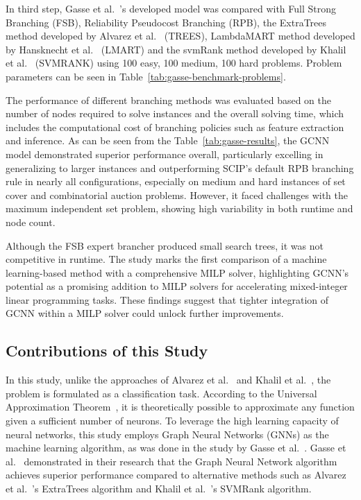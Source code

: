 In third step, Gasse et al.~\cite{gasseExactCombinatorialOptimization2019}'s developed model was compared with Full Strong Branching (FSB), Reliability Pseudocost Branching (RPB), the ExtraTrees method developed by Alvarez et al.~\cite{alvarezMachineLearningBasedApproximation2017} (TREES), LambdaMART method developed by Hansknecht et al.~\cite{hansknechtCutsPrimalHeuristics2018a} (LMART) and the svmRank method developed by Khalil et al.~\cite{khalilLearningBranchMixed2016} (SVMRANK) using 100 easy, 100 medium, 100 hard problems.
Problem parameters can be seen in Table~\ref{tab:gasse-benchmark-problems}.



The performance of different branching methods was evaluated based on the number of nodes required to solve instances and the overall solving time, which includes the computational cost of branching policies such as feature extraction and inference.
As can be seen from the Table~\ref{tab:gasse-results}, the GCNN model demonstrated superior performance overall, particularly excelling in generalizing to larger instances and outperforming SCIP's default RPB branching rule in nearly all configurations, especially on medium and hard instances of set cover and combinatorial auction problems.
However, it faced challenges with the maximum independent set problem, showing high variability in both runtime and node count.


Although the FSB expert brancher produced small search trees, it was not competitive in runtime.
The study marks the first comparison of a machine learning-based method with a comprehensive MILP solver, highlighting GCNN's potential as a promising addition to MILP solvers for accelerating mixed-integer linear programming tasks.
These findings suggest that tighter integration of GCNN within a MILP solver could unlock further improvements.



\subsection{Contributions of this Study}
In this study, unlike the approaches of Alvarez et al.~\cite{alvarezMachineLearningBasedApproximation2017} and Khalil et al.~\cite{khalilLearningBranchMixed2016}, the problem is formulated as a classification task.
According to the Universal Approximation Theorem~\cite{luUniversalApproximationTheorem2020}, it is theoretically possible to approximate any function given a sufficient number of neurons.
To leverage the high learning capacity of neural networks, this study employs Graph Neural Networks (GNNs) as the machine learning algorithm, as was done in the study by Gasse et al.~\cite{gasseExactCombinatorialOptimization2019}.
Gasse et al.~\cite{gasseExactCombinatorialOptimization2019} demonstrated in their research that the Graph Neural Network algorithm achieves superior performance compared to alternative methods such as Alvarez et al.~\cite{alvarezMachineLearningBasedApproximation2017}’s ExtraTrees algorithm and Khalil et al.~\cite{khalilLearningBranchMixed2016}’s SVMRank algorithm.


